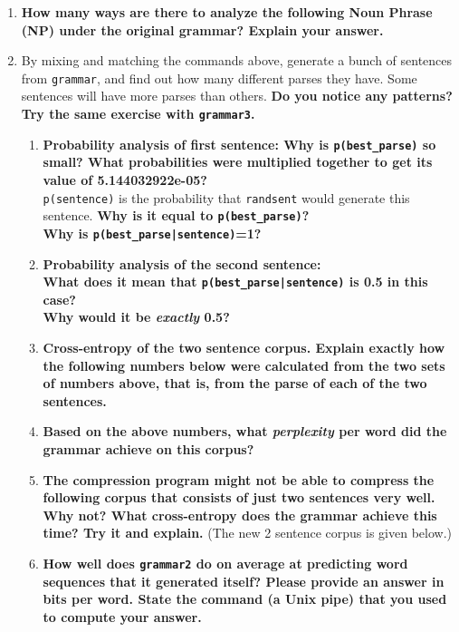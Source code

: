 \documentclass[10pt]{article}
\begin{document}
\begin{enumerate}
\begin{enumerate}
\item {\bf How many ways are there to analyze the following Noun Phrase (NP)
  under the original grammar?  Explain your answer.}

\item By mixing and matching the commands above, generate a bunch of
  sentences from \verb|grammar|, and find out how many different parses they
  have. Some sentences will have more parses than others. {\bf Do you
  notice any patterns? Try the same exercise with \verb|grammar3|.}

\begin{enumerate} 
\item {\bf Probability analysis of first sentence: Why is \verb|p(best_parse)| so small?  What probabilities were
  multiplied together to get its value of 5.144032922e-05?}\\
\noindent
\verb|p(sentence)| is the probability that \verb|randsent| would
  generate this sentence. {\bf Why is it equal to \verb|p(best_parse)|?}\\
\noindent
{\bf Why is \verb+p(best_parse|sentence)+=1?}

\item {\bf Probability analysis of the second sentence:  \\
\noindent
What does it mean that \verb+p(best_parse|sentence)+ is 0.5 in this
case? \\
\noindent
Why would it be {\it exactly} 0.5?}

\item {\bf Cross-entropy of the two sentence corpus. Explain exactly
    how the following numbers below were calculated from the two sets
    of numbers above, that is, from the parse of each of the two
    sentences.}

\item {\bf Based on the above numbers, what {\it perplexity} per word did
  the grammar achieve on this corpus?}

\item {\bf The compression program might not be able to compress the
    following corpus that consists of just two sentences very well.
    Why not? What cross-entropy does the grammar achieve this time?
    Try it and explain.}  (The new 2 sentence corpus is given below.)

\item {\bf How well does {\tt grammar2} do on average at predicting
    word sequences that it generated itself?  Please provide an answer
    in bits per word.  State the command (a Unix pipe) that you used
    to compute your answer.}


\end{enumerate}
\end{enumerate}
\end{enumerate}
\end{document}
